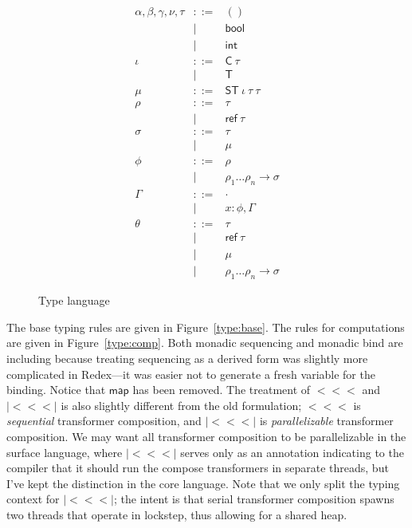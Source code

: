 \documentclass[twocolumn]{article}
\newcommand{\bnfdef}{::=}
\newcommand{\bnfalt}{\mathrel{\mid}}
\newcommand{\kw}[1]{\textsf{#1}}
\newcommand{\arr}{\mathrel{<\!\!<\!\!<}}
\newcommand{\parr}{\mathrel{|\!\!<\!\!<\!\!<\!\!|}}
\begin{document}
\begin{figure}
\begin{equation*}
\begin{array}{lcl}
  \alpha, \beta, \gamma, \nu, \tau
     & \bnfdef & () \\
     & \bnfalt & \kw{bool} \\
     & \bnfalt & \kw{int} \\
  \iota
     & \bnfdef & \kw{C}~ \tau \\
     & \bnfalt & \kw{T} \\
  \mu
     & \bnfdef & \kw{ST}~ \iota~ \tau~ \tau~ \\
  \rho
     & \bnfdef & \tau \\
     & \bnfalt & \kw{ref}~ \tau \\
  \sigma
     & \bnfdef & \tau \\
     & \bnfalt & \mu \\
  \phi
     & \bnfdef & \rho \\
     & \bnfalt & \rho_1 \ldots \rho_n \to \sigma \\
  \Gamma
     & \bnfdef & \cdot \\
     & \bnfalt & x : \phi, \Gamma \\
  \theta
     & \bnfdef & \tau \\
     & \bnfalt & \kw{ref}~ \tau \\
     & \bnfalt & \mu \\
     & \bnfalt & \rho_1 \ldots \rho_n \to \sigma
\end{array}
\end{equation*}
\caption{Type language}
\label{fig:lang:type}
\end{figure}

The base typing rules are given in Figure~\ref{type:base}. The rules for
computations are given in Figure~\ref{type:comp}. Both monadic sequencing and
monadic bind are including because treating sequencing as a derived form was
slightly more complicated in Redex---it was easier not to generate a fresh
variable for the binding. Notice that $\kw{map}$ has been removed. The treatment
of $\arr$ and $\parr$ is also slightly different from the old formulation;
$\arr$ is \emph{sequential} transformer composition, and $\parr$ is
\emph{parallelizable} transformer composition. We may want all transformer
composition to be parallelizable in the surface language, where $\parr$ serves
only as an annotation indicating to the compiler that it should run the compose
transformers in separate threads, but I've kept the distinction in the core
language. Note that we only split the typing context for $\parr$; the intent is
that serial transformer composition spawns two threads that operate in lockstep,
thus allowing for a shared heap.
\end{document}
